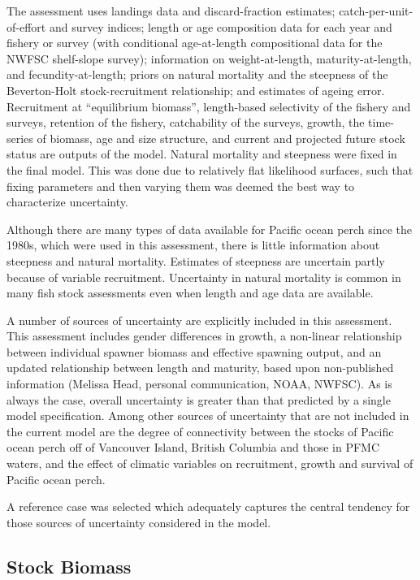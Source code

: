 \documentclass[12pt,]{article}
\begin{document}
The assessment uses landings data and discard-fraction estimates;
catch-per-unit-of-effort and survey indices; length or age composition
data for each year and fishery or survey (with conditional age-at-length
compositional data for the NWFSC shelf-slope survey); information on
weight-at-length, maturity-at-length, and fecundity-at-length; priors on
natural mortality and the steepness of the Beverton-Holt
stock-recruitment relationship; and estimates of ageing error.
Recruitment at ``equilibrium biomass'', length-based selectivity of the
fishery and surveys, retention of the fishery, catchability of the
surveys, growth, the time-series of biomass, age and size structure, and
current and projected future stock status are outputs of the model.
Natural mortality and steepness were fixed in the final model. This was
done due to relatively flat likelihood surfaces, such that fixing
parameters and then varying them was deemed the best way to characterize
uncertainty.

Although there are many types of data available for Pacific ocean perch
since the 1980s, which were used in this assessment, there is little
information about steepness and natural mortality. Estimates of
steepness are uncertain partly because of variable recruitment.
Uncertainty in natural mortality is common in many fish stock
assessments even when length and age data are available.

A number of sources of uncertainty are explicitly included in this
assessment. This assessment includes gender differences in growth, a
non-linear relationship between individual spawner biomass and effective
spawning output, and an updated relationship between length and
maturity, based upon non-published information (Melissa Head, personal
communication, NOAA, NWFSC). As is always the case, overall uncertainty
is greater than that predicted by a single model specification. Among
other sources of uncertainty that are not included in the current model
are the degree of connectivity between the stocks of Pacific ocean perch
off of Vancouver Island, British Columbia and those in PFMC waters, and
the effect of climatic variables on recruitment, growth and survival of
Pacific ocean perch.

A reference case was selected which adequately captures the central
tendency for those sources of uncertainty considered in the model.

\subsection*{Stock Biomass}\label{stock-biomass}
\end{document}
